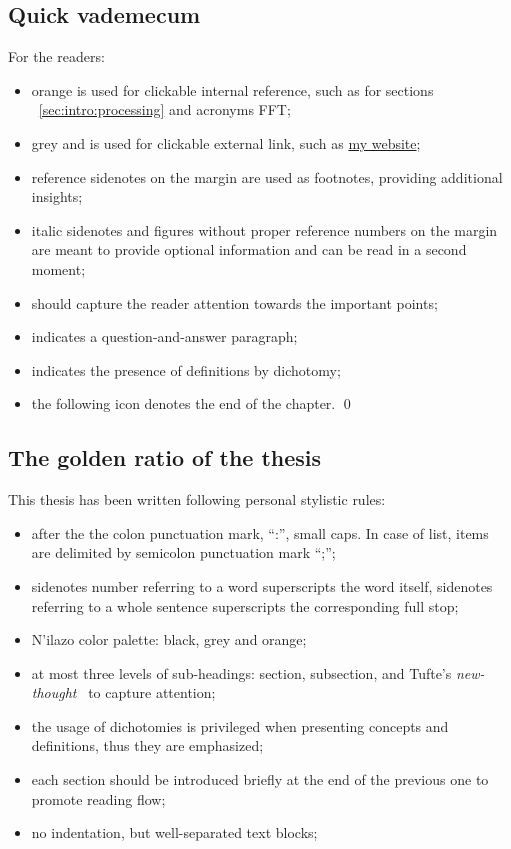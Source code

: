 \subsection{Quick vademecum}
For the readers:
\begin{itemize}
    \item \textcolor{myorange}{orange} is used for clickable internal reference, such as for sections ~\cref{sec:intro:processing} and acronyms \acs{FFT};
    \item \textcolor{mygray}{grey} and \ExternalLink is used for clickable external link, such as \href{www.diegodicarlo.com}{my website\ExternalLink};
    \item reference sidenotes on the margin are used as footnotes, providing additional insights;
    \item italic sidenotes and figures without proper reference numbers on the margin are meant to provide optional information and can be read in a second moment;
    \item \textcolor{black!30}{\scriptsize\raisebox{1pt}{$\blacktriangleright$}}\hspace{0.2em}should capture the reader attention towards the important points;
    \item \textcolor{black!30}{\scriptsize{}}\hspace{0.2em}indicates a question-and-answer paragraph;
    \item \textcolor{black!30}{\scriptsize\raisebox{1pt}{$\rightleftarrows$}}\hspace{0.2em}indicates the presence of definitions by dichotomy;
    \item the following icon denotes the end of the chapter. \qed
\end{itemize}

\subsection{The golden ratio of the thesis}
This thesis has been written following personal stylistic rules:
\begin{itemize}
    \item after the the colon punctuation mark, ``:'', small caps. In case of list, items are delimited by semicolon punctuation mark ``;'';
    \item sidenotes number referring to a word superscripts the word itself, sidenotes referring to a whole sentence superscripts the corresponding full stop;
    \item N'ilazo color palette: black, grey and orange;
    \item at most three levels of sub-headings: section, subsection, and Tufte's \textit{new-thought}~ to capture attention;
    \item the usage of dichotomies is privileged when presenting concepts and definitions, thus they are emphasized;
    \item each section should be introduced briefly at the end of the previous one to promote reading flow;
    \item no indentation, but well-separated text blocks;
\end{itemize}



